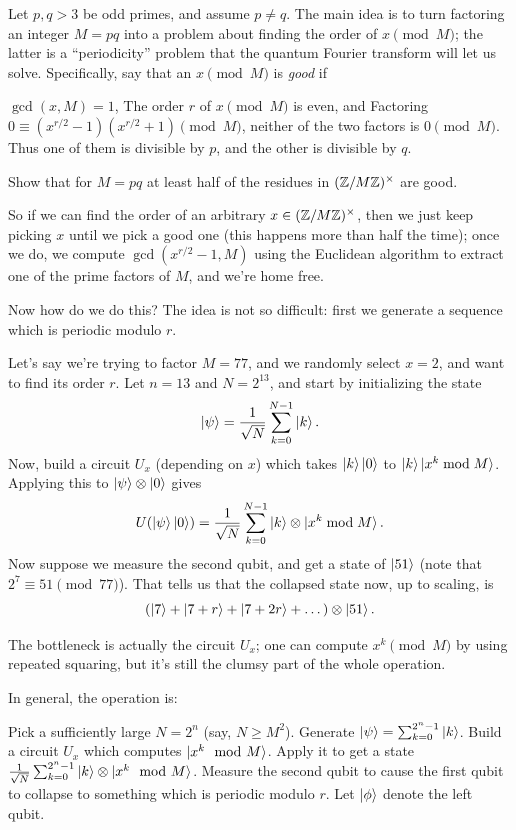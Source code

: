 Let $p,q > 3$ be odd primes, and assume $p \neq q$.
The main idea is to turn factoring an integer $M = pq$ into a problem
about finding the order of $x \pmod M$; the latter is a ``periodicity''
problem that the quantum Fourier transform will let us solve.
Specifically, say that an $x \pmod M$ is \emph{good} if
\begin{enumerate}[(i)]
	\ii $\gcd(x,M) = 1$,
	\ii The order $r$ of $x \pmod M$ is even, and
	\ii Factoring $0 \equiv (x^{r/2}-1)(x^{r/2}+1) \pmod M$,
	neither of the two factors is $0 \pmod M$.
	Thus one of them is divisible by $p$, and the other
	is divisible by $q$.
\end{enumerate}
\begin{exercise}
	Show that for $M = pq$ at least half of the residues
	in $(\mathbb Z/M\mathbb Z)^\times$ are good.
\end{exercise}

So if we can find the order of an arbitrary $x \in (\mathbb Z/M\mathbb Z)^\times$,
then we just keep picking $x$ until we pick a good one
(this happens more than half the time);
once we do, we compute $\gcd(x^{r/2}-1,M)$ using the Euclidean
algorithm to extract one of the prime factors of $M$, and we're home free.

Now how do we do this?  The idea is not so difficult:
first we generate a sequence which is periodic modulo $r$.
\begin{example}
	Let's say we're trying to factor $M = 77$,
	and we randomly select $x = 2$, and want to find its order $r$.
	Let $n = 13$ and $N = 2^{13}$, and start by initializing the state
	\[ \ket\psi = \frac{1}{\sqrt N} \sum_{k=0}^{N-1} \ket k. \]
	Now, build a circuit $U_x$ (depending on $x$)
	which takes $\ket k \ket 0$ to $\ket k \ket{x^k \bmod M}$.
	Applying this to $\ket\psi \otimes \ket0$ gives
	\[ U(\ket\psi\ket0) =
		\frac{1}{\sqrt N} \sum_{k=0}^{N-1} \ket k \otimes \ket{x^k \bmod M}. \]
	Now suppose we measure the second qubit, and get a state of $\ket{51}$
		(note that $2^7 \equiv 51 \pmod{77}$).
	That tells us that the collapsed state now, up to scaling, is
	\[ (\ket{7} + \ket{7+r} + \ket{7+2r} + \dots) \otimes \ket{51}. \]
\end{example}
The bottleneck is actually the circuit $U_x$;
one can compute $x^k \pmod M$ by using repeated squaring,
but it's still the clumsy part of the whole operation.

In general, the operation is:
\begin{itemize}
	\ii Pick a sufficiently large $N = 2^n$ (say, $N \ge M^2$).
	\ii Generate $\ket\psi = \sum_{k=0}^{2^n-1} \ket{k}$.
	\ii Build a circuit $U_x$ which computes $\ket{x^k \mod M}$.
	\ii Apply it to get a state
	$\frac{1}{\sqrt N} \sum_{k=0}^{2^n-1} \ket k \otimes \ket{x^k \mod M}$.
	\ii Measure the second qubit to cause the first qubit to
	collapse to something which is periodic modulo $r$.
	Let $\ket\phi$ denote the left qubit.
\end{itemize}

